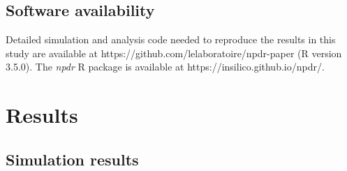 \documentclass{bioinfo}
\begin{document}
\subsection{Software availability}
Detailed simulation and analysis code needed to reproduce the results in this study are available at {{https://github.com/lelaboratoire/npdr-paper}} (R version 3.5.0).
The \emph{npdr} R package is available at {{https://insilico.github.io/npdr/}}.


\section{Results}
\subsection{Simulation results} 

\end{document}
